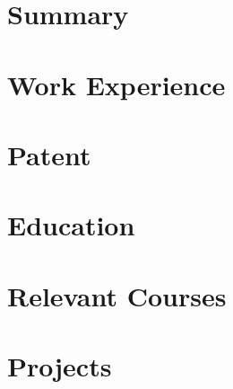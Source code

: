 \documentclass[letter,10pt]{article}
\begin{document}
\section{Summary}


\section{Work Experience}


\section{Patent}


\section{Education}


\section{Relevant Courses}


\section{Projects}

\end{document}
